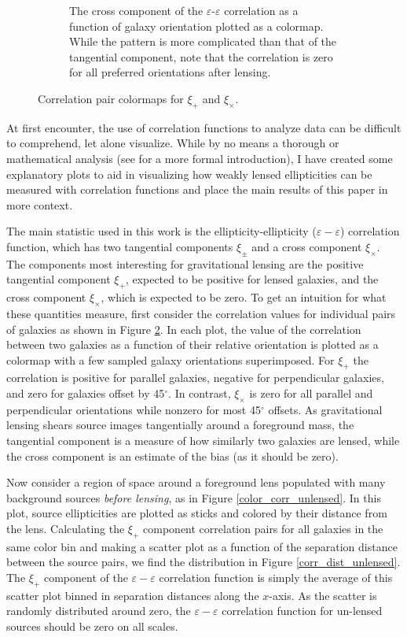 \documentclass[%
 reprint,
 amsmath,amssymb,
 aps,nofootinbib
]{revtex4-1}
\begin{document}
\begin{figure}[!b]
\begin{subfigure}{0.425\textwidth}
        \captionsetup{justification=raggedright,singlelinecheck=false}
        \caption{The cross component of the $\varepsilon$-$\varepsilon$ correlation as a function of galaxy orientation plotted as a colormap. While the pattern is more complicated than that of the tangential component, note that the correlation is zero for all preferred orientations after lensing.}
        \label{xix_colormap}
    \end{subfigure}
    \caption{Correlation pair colormaps for $\xi_+$ and $\xi_\times$.}
    \label{corr_colormaps}
\end{figure}

At first encounter, the use of correlation functions to analyze data can be difficult to comprehend, let alone visualize. While by no means a thorough or mathematical analysis (see \cite{correlation_functions} for a more formal introduction), I have created some explanatory plots to aid in visualizing how weakly lensed ellipticities can be measured with correlation functions and place the main results of this paper in more context.

The main statistic used in this work is the ellipticity-ellipticity ($\varepsilon-\varepsilon$) correlation function, which has two tangential components $\xi_\pm$ and a cross component $\xi_\times$. The components most interesting for gravitational lensing are the positive tangential component $\xi_+$, expected to be positive for lensed galaxies, and the cross component $\xi_\times$, which is expected to be zero. To get an intuition for what these quantities measure, first consider the correlation values for individual pairs of galaxies as shown in Figure \ref{corr_colormaps}. In each plot, the value of the correlation between two galaxies as a function of their relative orientation is plotted as a colormap with a few sampled galaxy orientations superimposed. For $\xi_+$ the correlation is positive for parallel galaxies, negative for perpendicular galaxies, and zero for galaxies offset by 45$^\circ$. In contrast, $\xi_\times$ is zero for all parallel and perpendicular orientations while nonzero for most 45$^\circ$ offsets. As gravitational lensing shears source images tangentially around a foreground mass, the tangential component is a measure of how similarly two galaxies are lensed, while the cross component is an estimate of the bias (as it should be zero).

Now consider a region of space around a foreground lens populated with many background sources \textit{before lensing}, as in Figure \ref{color_corr_unlensed}. In this plot, source ellipticities are plotted as sticks and colored by their distance from the lens. Calculating the $\xi_+$ component correlation pairs for all galaxies in the same color bin and making a scatter plot as a function of the separation distance between the source pairs, we find the distribution in Figure \ref{corr_dist_unlensed}. The $\xi_+$ component of the $\varepsilon-\varepsilon$ correlation function is simply the average of this scatter plot binned in separation distances along the $x$-axis. As the scatter is randomly distributed around zero, the $\varepsilon-\varepsilon$ correlation function for un-lensed sources should be zero on all scales.
\end{document}
